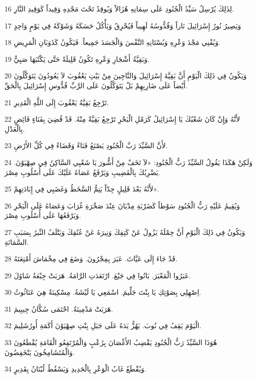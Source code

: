 \par 16 لِذَلِكَ يُرْسِلُ سَيِّدُ الْجُنُودِ عَلَى سِمَانِهِ هُزَالاً وَيُوقِدُ تَحْتَ مَجْدِهِ وَقِيداً كَوَقِيدِ النَّارِ.
\par 17 وَيَصِيرُ نُورُ إِسْرَائِيلَ نَاراً وَقُدُّوسُهُ لَهِيباً فَيُحْرِقُ وَيَأْكُلُ حَسَكَهُ وَشَوْكَهُ فِي يَوْمٍ وَاحِدٍ
\par 18 وَيُفْنِي مَجْدَ وَعْرِهِ وَبُسْتَانِهِ النَّفْسَ وَالْجَسَدَ جَمِيعاً. فَيَكُونُ كَذَوَبَانِ الْمَرِيضِ.
\par 19 وَبَقِيَّةُ أَشْجَارِ وَعْرِهِ تَكُونُ قَلِيلَةً حَتَّى يَكْتُبَهَا صَبِيٌّ.
\par 20 وَيَكُونُ فِي ذَلِكَ الْيَوْمِ أَنَّ بَقِيَّةَ إِسْرَائِيلَ وَالنَّاجِينَ مِنْ بَيْتِ يَعْقُوبَ لاَ يَعُودُونَ يَتَوَكَّلُونَ أَيْضاً عَلَى ضَارِبِهِمْ بَلْ يَتَوَكَّلُونَ عَلَى الرَّبِّ قُدُّوسِ إِسْرَائِيلَ بِالْحَقِّ.
\par 21 تَرْجِعُ بَقِيَّةُ يَعْقُوبَ إِلَى اللَّهِ الْقَدِيرِ.
\par 22 لأَنَّهُ وَإِنْ كَانَ شَعْبُكَ يَا إِسْرَائِيلُ كَرَمْلِ الْبَحْرِ تَرْجِعُ بَقِيَّةٌ مِنْهُ. قَدْ قُضِيَ بِفَنَاءٍ فَائِضٍ بِالْعَدْلِ.
\par 23 لأَنَّ السَّيِّدَ رَبَّ الْجُنُودِ يَصْنَعُ فَنَاءً وَقَضَاءً فِي كُلِّ الأَرْضِ.
\par 24 وَلَكِنْ هَكَذَا يَقُولُ السَّيِّدُ رَبُّ الْجُنُودِ: «لاَ تَخَفْ مِنْ أَشُّورَ يَا شَعْبِي السَّاكِنُ فِي صِهْيَوْنَ. يَضْرِبُكَ بِالْقَضِيبِ وَيَرْفَعُ عَصَاهُ عَلَيْكَ عَلَى أُسْلُوبِ مِصْرَ.
\par 25 لأَنَّهُ بَعْدَ قَلِيلٍ جِدّاً يَتِمُّ السَّخَطُ وَغَضَبِي فِي إِبَادَتِهِمْ».
\par 26 وَيُقِيمُ عَلَيْهِ رَبُّ الْجُنُودِ سَوْطاً كَضَرْبَةِ مِدْيَانَ عِنْدَ صَخْرَةِ غُرَابَ وَعَصَاهُ عَلَى الْبَحْرِ وَيَرْفَعُهَا عَلَى أُسْلُوبِ مِصْرَ.
\par 27 وَيَكُونُ فِي ذَلِكَ الْيَوْمِ أَنَّ حِمْلَهُ يَزُولُ عَنْ كَتِفِكَ وَنِيرَهُ عَنْ عُنُقِكَ وَيَتْلَفُ النِّيرُ بِسَبَبِ السَّمَانَةِ.
\par 28 قَدْ جَاءَ إِلَى عَيَّاثَ. عَبَرَ بِمِجْرُونَ. وَضَعَ فِي مِخْمَاشَ أَمْتِعَتَهُ.
\par 29 عَبَرُوا الْمَعْبَرَ. بَاتُوا فِي جَبْعَ. ارْتَعَدَتِ الرَّامَةُ. هَرَبَتْ جِبْعَةُ شَاوُلَ.
\par 30 اِصْهِلِي بِصَوْتِكِ يَا بِنْتَ جَلِّيمَ. اسْمَعِي يَا لَيْشَةُ. مِسْكِينَةٌ هِيَ عَنَاثُوثُ.
\par 31 هَرَبَتْ مَدْمِينَةُ. احْتَمَى سُكَّانُ جِيبِيمَ.
\par 32 الْيَوْمَ يَقِفُ فِي نُوبَ. يَهُزُّ يَدَهُ عَلَى جَبَلِ بِنْتِ صِهْيَوْنَ أَكَمَةِ أُورُشَلِيمَ.
\par 33 هُوَذَا السَّيِّدُ رَبُّ الْجُنُودِ يَقْضِبُ الأَغْصَانَ بِرُعْبٍ وَالْمُرْتَفِعُو الْقَامَةِ يُقْطَعُونَ وَالْمُتَشَامِخُونَ يَنْخَفِضُونَ.
\par 34 وَيُقْطَعُ غَابُ الْوَعْرِ بِالْحَدِيدِ وَيَسْقُطُ لُبْنَانُ بِقَدِيرٍ.

